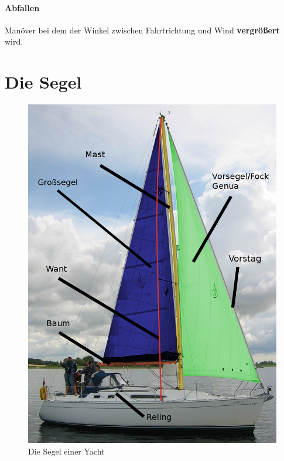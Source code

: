 \documentclass[12pt]{article}
\begin{document}
\paragraph{Abfallen}
Manöver bei dem der Winkel zwischen Fahrtrichtung und Wind \textbf{vergrößert} wird.


\section{Die Segel}

\begin{figure}[h!]
\begin{center}
\includegraphics[scale=0.2]{bilder/yacht.png}
\end{center}
\caption{Die Segel einer Yacht}
\label{segel}
\end{figure}
\end{document}
